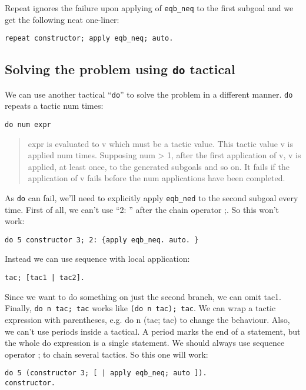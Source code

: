 \documentclass[12pt]{article}
\begin{document}
Repeat ignores the failure upon applying of {\tt eqb\_neq} to the first subgoal and we get the following neat one-liner:

\begin{verbatim}
repeat constructor; apply eqb_neq; auto.
\end{verbatim}

\subsection{Solving the problem using {\tt do} tactical}

We can use another tactical ``{\tt do}'' to solve the problem in a different manner. {\tt do} repeats a tactic num times:

\begin{verbatim}
do num expr
\end{verbatim}

\begin{quote}
expr is evaluated to v which must be a tactic value. This tactic value v is applied num times. Supposing num > 1, after the first application of v, v is applied, at least once, to the generated subgoals and so on. It fails if the application of v fails before the num applications have been completed.
\end{quote}

As {\tt do} can fail, we'll need to explicitly apply {\tt eqb\_ned} to the second subgoal every time. First of all, we can't use ``2: {}'' after the chain operator ;. So this won't work:

\begin{verbatim}
do 5 constructor 3; 2: {apply eqb_neq. auto. }
\end{verbatim}

Instead we can use sequence with local application:

\begin{verbatim}
tac; [tac1 | tac2].
\end{verbatim}

Since we want to do something on just the second branch, we can omit tac1. Finally, {\tt do n tac; tac} works like {\tt (do n tac); tac}. We can wrap a tactic expression with parentheses, e.g. do n (tac; tac) to change the behaviour. Also, we can't use periods inside a tactical. A period marks the end of a statement, but the whole do expression is a single statement. We should always use sequence operator ; to chain several tactics. So this one will work:

\begin{verbatim}
do 5 (constructor 3; [ | apply eqb_neq; auto ]).
constructor.
\end{verbatim}
\end{document}
